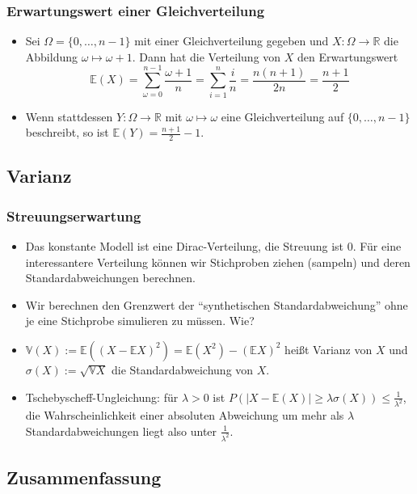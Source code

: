    \begin{frame}
    \frametitle{Erwartungswert einer Gleichverteilung}
    \begin{itemize}[<+->]
    \item Sei $\Omega = \{0,\dots,n-1\}$ mit einer Gleichverteilung gegeben und $X \colon \Omega \to \mathbb{R}$ die Abbildung $\omega \mapsto \omega+1$. Dann hat die Verteilung von $X$ den Erwartungswert
      \[\mathbb{E}(X) = \sum_{\omega=0}^{n-1} \frac{\omega+1}{n} = \sum_{i=1}^{n} \frac{i}{n}  = \frac{n(n+1)}{2n} = \frac{n+1}{2}\]
      \item Wenn stattdessen $Y \colon \Omega \to \mathbb{R}$ mit $\omega \mapsto \omega$ eine Gleichverteilung auf $\{0,\dots,n-1\}$ beschreibt, so ist $\mathbb{E}(Y) = \frac{n+1}{2}-1$.
\end{itemize}
\end{frame}

\subsection{Varianz}

   \begin{frame}
    \frametitle{Streuungserwartung}
\begin{itemize}[<+->]
\item Das konstante Modell ist eine Dirac-Verteilung, die Streuung ist $0$. Für eine interessantere Verteilung können wir Stichproben ziehen (sampeln) und deren Standardabweichungen berechnen.
\item Wir berechnen den Grenzwert der ``synthetischen Standardabweichung'' ohne je eine Stichprobe simulieren zu müssen. Wie?
\item $\mathbb{V}(X) := \mathbb{E}\left({\left(X-\mathbb{E}X\right)}^2\right) = \mathbb{E}(X^2) - {\left(\mathbb{E}X\right)}^2$ heißt \alert{Varianz} von $X$
  und\\
  $\sigma(X) := \sqrt{\mathbb{V}X}$ die \alert{Standardabweichung} von $X$.
\item Tschebyscheff-Ungleichung: für $\lambda > 0$ ist
  $P\left(|X - \mathbb{E}(X)| \geq \lambda \sigma(X)\right) \leq \frac{1}{\lambda^2}$,
  die Wahrscheinlichkeit einer absoluten Abweichung um mehr als $\lambda$ Standardabweichungen liegt also unter $\frac{1}{\lambda^2}$.
\end{itemize}
\end{frame}

\subsection{Zusammenfassung}

